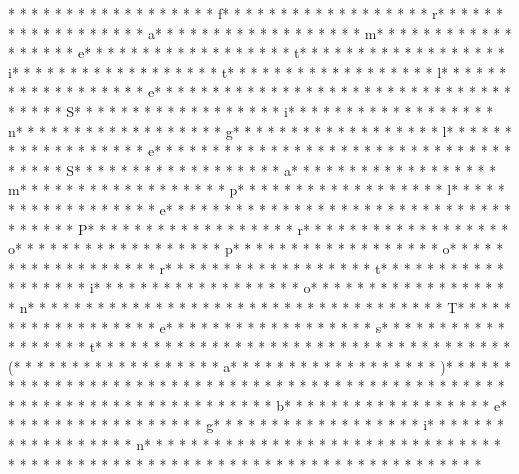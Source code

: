 * * *  * * *  * * *  *  * * *  *  * * *  * f* * *  * * *  * * *  *  * * *  *  * * *  * r* * *  * * *  * * *  *  * * *  *  * * *  * a* * *  * * *  * * *  *  * * *  *  * * *  * m* * *  * * *  * * *  *  * * *  *  * * *  * e* * *  * * *  * * *  *  * * *  *  * * *  * t* * *  * * *  * * *  *  * * *  *  * * *  * i* * *  * * *  * * *  *  * * *  *  * * *  * t* * *  * * *  * * *  *  * * *  *  * * *  * l* * *  * * *  * * *  *  * * *  *  * * *  * e* * *  * * *  * * *  *  * * *  *  * * *  * {* * *  * * *  * * *  *  * * *  *  * * *  * S* * *  * * *  * * *  *  * * *  *  * * *  * i* * *  * * *  * * *  *  * * *  *  * * *  * n* * *  * * *  * * *  *  * * *  *  * * *  * g* * *  * * *  * * *  *  * * *  *  * * *  * l* * *  * * *  * * *  *  * * *  *  * * *  * e* * *  * * *  * * *  *  * * *  *  * * *  *  * * *  * * *  * * *  *  * * *  *  * * *  * S* * *  * * *  * * *  *  * * *  *  * * *  * a* * *  * * *  * * *  *  * * *  *  * * *  * m* * *  * * *  * * *  *  * * *  *  * * *  * p* * *  * * *  * * *  *  * * *  *  * * *  * l* * *  * * *  * * *  *  * * *  *  * * *  * e* * *  * * *  * * *  *  * * *  *  * * *  *  * * *  * * *  * * *  *  * * *  *  * * *  * P* * *  * * *  * * *  *  * * *  *  * * *  * r* * *  * * *  * * *  *  * * *  *  * * *  * o* * *  * * *  * * *  *  * * *  *  * * *  * p* * *  * * *  * * *  *  * * *  *  * * *  * o* * *  * * *  * * *  *  * * *  *  * * *  * r* * *  * * *  * * *  *  * * *  *  * * *  * t* * *  * * *  * * *  *  * * *  *  * * *  * i* * *  * * *  * * *  *  * * *  *  * * *  * o* * *  * * *  * * *  *  * * *  *  * * *  * n* * *  * * *  * * *  *  * * *  *  * * *  *  * * *  * * *  * * *  *  * * *  *  * * *  * T* * *  * * *  * * *  *  * * *  *  * * *  * e* * *  * * *  * * *  *  * * *  *  * * *  * s* * *  * * *  * * *  *  * * *  *  * * *  * t* * *  * * *  * * *  *  * * *  *  * * *  *  * * *  * * *  * * *  *  * * *  *  * * *  * (* * *  * * *  * * *  *  * * *  *  * * *  * a* * *  * * *  * * *  *  * * *  *  * * *  * )* * *  * * *  * * *  *  * * *  *  * * *  * }* * *  * * *  * * *  *  * * *  *  * * *  * 
* * *  * * *  * * *  *  * * *  *  * * *  * 
* * *  * * *  * * *  *  * * *  *  * * *  * b* * *  * * *  * * *  *  * * *  *  * * *  * e* * *  * * *  * * *  *  * * *  *  * * *  * g* * *  * * *  * * *  *  * * *  *  * * *  * i* * *  * * *  * * *  *  * * *  *  * * *  * n* * *  * * *  * * *  *  * * *  *  * * *  * {* * *  * * *  * * *  *  * * *  *  * * *  *  * * *  * * *  * * *  *  * * *  *  * * *  * }* * *  * * *  * * *  *  * * *  *  * * *  * 
